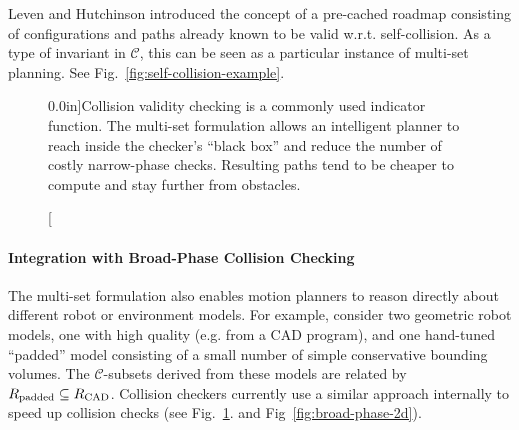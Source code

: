 Leven and Hutchinson \citep{leven2000changing}
introduced the concept of a pre-cached roadmap consisting of
configurations and paths already known to be valid w.r.t.
self-collision.
As a type of invariant in $\mathcal{C}$,
this can be seen as a particular instance of multi-set planning.
See Fig.~\ref{fig:self-collision-example}.

\begin{figure}[b]
   \centering
   
   \quad%
   
   \caption[][0.0in]{Collision validity checking is a commonly used
     indicator function.
     The multi-set formulation allows an intelligent planner to
     reach inside the checker's ``black box'' and reduce the number
     of costly narrow-phase checks.
     Resulting paths tend to be cheaper to compute and
     stay further from obstacles.}
   \label{fig:broad-phase}
\end{figure}

\paragraph{Integration with Broad-Phase Collision Checking}
\label{subsec:broad-phase}

The multi-set formulation also enables motion planners to
reason directly about different robot or environment models.
For example, consider two geometric robot models,
one with high quality (e.g. from a CAD program),
and one hand-tuned ``padded'' model consisting of 
a small number of simple conservative bounding volumes.
The $\mathcal{C}$-subsets derived from these models
are related by $R_{\mbox{\scriptsize padded}} \subseteq R_{\mbox{\scriptsize CAD}}$.
Collision checkers currently use a similar approach internally
to speed up collision checks (see Fig.~\ref{fig:broad-phase}.
and Fig~\ref{fig:broad-phase-2d}).


